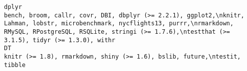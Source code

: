\documentclass[
  letterpaper,
  DIV=11,
  numbers=noendperiod]{scrreprt}
\begin{document}
\begin{verbatim}
dplyr                                                                                                                                                                                                                                                                                                                                                                                                                                                                                                                                                                                                                                                                                                                                                                                                                                                                                                                                                                                                                                                                    bench, broom, callr, covr, DBI, dbplyr (>= 2.2.1), ggplot2,\nknitr, Lahman, lobstr, microbenchmark, nycflights13, purrr,\nrmarkdown, RMySQL, RPostgreSQL, RSQLite, stringi (>= 1.7.6),\ntestthat (>= 3.1.5), tidyr (>= 1.3.0), withr
DT                                                                                                                                                                                                                                                                                                                                                                                                                                                                                                                                                                                                                                                                                                                                                                                                                                                                                                                                                                                                                                                                                                                                                                                                                                  knitr (>= 1.8), rmarkdown, shiny (>= 1.6), bslib, future,\ntestit, tibble

\end{verbatim}
\end{document}
